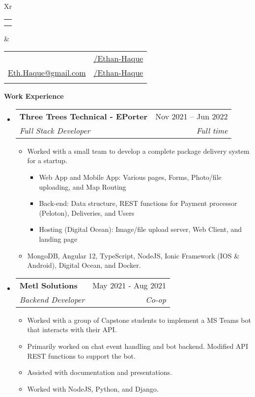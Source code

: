 \documentclass[letterpaper,12pt]{article}[leftmargin=*]
\makeatletter
\def \fullname {Ethan Haque}
\def \subtitle {}
\def \linkedinicon {\faLinkedin}
\def \linkedinlink {https://www.linkedin.com/in/ethan-haque}
\def \linkedintext {/Ethan-Haque}
\def \phoneicon {\faPhone}
\def \phonetext {250-880-4402}
\def \emailicon {\faEnvelope}
\def \emaillink {mailto:eth.haque@gmail.com}
\def \emailtext {Eth.Haque@gmail.com}
\def \githubicon {\faGithub}
\def \githublink {https://github.com/Ethan-Haque}
\def \githubtext {/Ethan-Haque}
\def \headertype {\doublecol} %
\def \entryspacing {-0pt}
\def \linkedin {\linkedinicon \hspace{3pt}\href{\linkedinlink}{\linkedintext}}
\def \phone {\phoneicon \hspace{3pt}{ \phonetext}}
\def \email {\emailicon \hspace{3pt}\href{\emaillink}{\emailtext}}
\def \github {\githubicon \hspace{3pt}\href{\githublink}{\githubtext}}
\renewcommand{\section}[2]{\vspace{5pt}
  \colorbox{secondary}{\color{white}\raggedbottom\normalsize\textbf{{#1}{\hspace{7pt}#2}}}
}
\newcommand{\resumeEntryStart}{\begin{itemize}[leftmargin=2.5mm]}
\newcommand{\resumeEntryEnd}{\end{itemize}\vspace{\entryspacing}}
\newcommand{\resumeItemListStart}{\begin{itemize}[leftmargin=4.5mm]}
\newcommand{\resumeItemListEnd}{\end{itemize}}
\newcommand{\resumeItem}[1]{
  \item\small{
    {#1 \vspace{-2pt}}
  }
}
\newcommand{\resumeEntryTSDL}[4]{
  \vspace{-1pt}\item[]
    \begin{tabularx}{0.97\textwidth}{X@{\hspace{60pt}}r}
      \textbf{\color{primary}#1} & {\firabook\color{accent}\small#2} \\
      \textit{\color{accent}\small#3} & \textit{\color{accent}\small#4} \\
    \end{tabularx}\vspace{-6pt}
}
\newcommand{\doublecol}[6]{
  \begin{tabularx}{\textwidth}{Xr}
    {
      \begin{tabular}[c]{l}
        \fontsize{35}{45}\selectfont{\color{primary}{{\textbf{\fullname}}}} \\
        {\textit{\subtitle}} %
      \end{tabular}
    } & {
      \begin{tabular}[c]{l@{\hspace{1.5em}}l}
        {\small#4} & {\small#1} \\
        {\small#5} & {\small#2} \\
        {\small#6} & {\small#3}
      \end{tabular}
    }
  \end{tabularx}
}
\newcommand{\singlecol}[6]{
  \begin{tabularx}{\textwidth}{Xr}
    {
      \begin{tabular}[b]{l}
        \fontsize{35}{45}\selectfont{\color{primary}{{\textbf{\fullname}}}} \\
        {\textit{\subtitle}} %
      \end{tabular}
    } & {
      \begin{tabular}[c]{l}
        {\small#1} \\
        {\small#2} \\
        {\small#3} \\
        {\small#4} \\
        {\small#5} \\
        {\small#6}
      \end{tabular}
    }
  \end{tabularx}
}
\makeatother
\begin{document}


\headertype{\linkedin}{\github}{}{\phone}{\email}{} %


\section{\faPieChart}{Work Experience}

  \resumeEntryStart
    \resumeEntryTSDL
      {Three Trees Technical - EPorter}{Nov 2021 -- Jun 2022}
      {Full Stack Developer}{Full time}
    \resumeItemListStart
      \resumeItem {Worked with a small team to develop a complete package delivery system for a startup.}
      \resumeItemListStart
        \resumeItem {Web App and Mobile App: Various pages, Forms, Photo/file uploading, and Map Routing} 
        \resumeItem {Back-end: Data structure, REST functions for Payment processor (Peloton), Deliveries, and Users}
        \resumeItem {Hosting (Digital Ocean): Image/file upload server, Web Client, and landing page}
      \resumeItemListEnd
      \resumeItem {MongoDB, Angular 12, TypeScript, NodeJS, Ionic Framework (IOS \& Android), Digital Ocean, and Docker.}
    \resumeItemListEnd
  \resumeEntryEnd

  \resumeEntryStart
    \resumeEntryTSDL
      {Metl Solutions}{May 2021 - Aug 2021}
      {Backend Developer}{Co-op}
    \resumeItemListStart
      \resumeItem {Worked with a group of Capstone students to implement a MS Teams bot that interacts with their API.}
      \resumeItem {Primarily worked on chat event handling and bot backend. Modified API REST functions to support the bot.}
      \resumeItem {Assisted with documentation and presentations.}
      \resumeItem {Worked with NodeJS, Python, and Django.}
    \resumeItemListEnd
  \resumeEntryEnd


\end{document}
